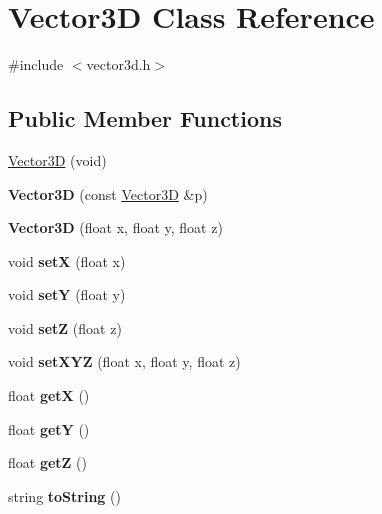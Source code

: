 \hypertarget{class_vector3_d}{
\section{Vector3D Class Reference}
\label{class_vector3_d}
}


{\ttfamily \#include $<$vector3d.h$>$}

\subsection*{Public Member Functions}
\begin{DoxyCompactItemize}
\item 
\hyperlink{class_vector3_d_a4c96ce0e3c660ca8615641c101f84f5b}{Vector3D} (void)
\item 
\hypertarget{class_vector3_d_a8246940d24bca451e2b272b0a3bfcdd8}{
{\bfseries Vector3D} (const \hyperlink{class_vector3_d}{Vector3D} \&p)}
\label{class_vector3_d_a8246940d24bca451e2b272b0a3bfcdd8}

\item 
\hypertarget{class_vector3_d_a17ed921510dc931d9686b7d9333f6d57}{
{\bfseries Vector3D} (float x, float y, float z)}
\label{class_vector3_d_a17ed921510dc931d9686b7d9333f6d57}

\item 
\hypertarget{class_vector3_d_ac3904b095a2440b9067effc640cf7e5e}{
void {\bfseries setX} (float x)}
\label{class_vector3_d_ac3904b095a2440b9067effc640cf7e5e}

\item 
\hypertarget{class_vector3_d_a4672b17cd2a364928149b689958e273d}{
void {\bfseries setY} (float y)}
\label{class_vector3_d_a4672b17cd2a364928149b689958e273d}

\item 
\hypertarget{class_vector3_d_a2433f43f72a29a8b330ca6ef346eb6ab}{
void {\bfseries setZ} (float z)}
\label{class_vector3_d_a2433f43f72a29a8b330ca6ef346eb6ab}

\item 
\hypertarget{class_vector3_d_a9e643441263c2f8dc804a19b9f8f792f}{
void {\bfseries setXYZ} (float x, float y, float z)}
\label{class_vector3_d_a9e643441263c2f8dc804a19b9f8f792f}

\item 
\hypertarget{class_vector3_d_af3d8e02a27e13d31831a3329402548c2}{
float {\bfseries getX} ()}
\label{class_vector3_d_af3d8e02a27e13d31831a3329402548c2}

\item 
\hypertarget{class_vector3_d_abcffa21ac0e55556ff519ef521f6fbc0}{
float {\bfseries getY} ()}
\label{class_vector3_d_abcffa21ac0e55556ff519ef521f6fbc0}

\item 
\hypertarget{class_vector3_d_a5f54a4dc4864266c310949f9fe53df81}{
float {\bfseries getZ} ()}
\label{class_vector3_d_a5f54a4dc4864266c310949f9fe53df81}

\item 
\hypertarget{class_vector3_d_abf3f6bccd39e45ef1facff1ddd5dc2db}{
string {\bfseries toString} ()}
\label{class_vector3_d_abf3f6bccd39e45ef1facff1ddd5dc2db}

\end{DoxyCompactItemize}


